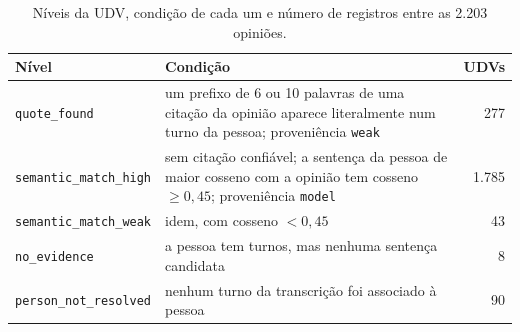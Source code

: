 \begin{table}[H]
  \centering
  \caption{Níveis da UDV, condição de cada um e número de registros entre as 2.203 opiniões.}
  \label{tab:udv-niveis}
  \small
  \begin{tabular}{p{3.3cm}p{8.2cm}r}
    \toprule
    \textbf{Nível} & \textbf{Condição} & \textbf{UDVs} \\
    \midrule
    \texttt{quote\_found}         & um prefixo de 6 ou 10 palavras de uma citação da opinião aparece literalmente num turno da pessoa; proveniência \texttt{weak} & 277 \\
    \texttt{semantic\_match\_high} & sem citação confiável; a sentença da pessoa de maior cosseno com a opinião tem cosseno $\geq 0{,}45$; proveniência \texttt{model} & 1.785 \\
    \texttt{semantic\_match\_weak} & idem, com cosseno $< 0{,}45$ & 43 \\
    \texttt{no\_evidence}         & a pessoa tem turnos, mas nenhuma sentença candidata & 8 \\
    \texttt{person\_not\_resolved} & nenhum turno da transcrição foi associado à pessoa & 90 \\
    \bottomrule
  \end{tabular}
\end{table}
